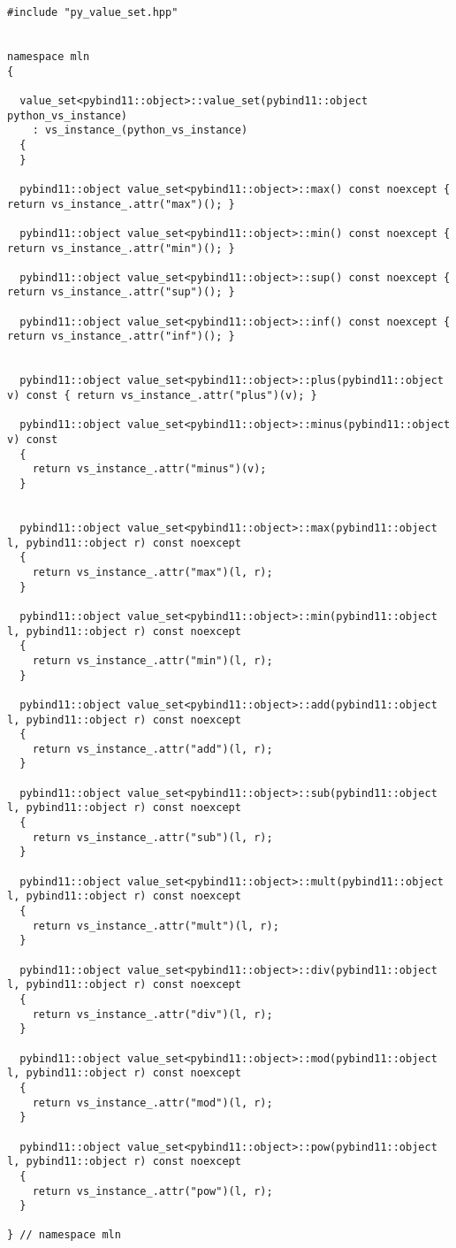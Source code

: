 \begin{verbatim}
#include "py_value_set.hpp"


namespace mln
{

  value_set<pybind11::object>::value_set(pybind11::object python_vs_instance)
    : vs_instance_(python_vs_instance)
  {
  }

  pybind11::object value_set<pybind11::object>::max() const noexcept { return vs_instance_.attr("max")(); }

  pybind11::object value_set<pybind11::object>::min() const noexcept { return vs_instance_.attr("min")(); }

  pybind11::object value_set<pybind11::object>::sup() const noexcept { return vs_instance_.attr("sup")(); }

  pybind11::object value_set<pybind11::object>::inf() const noexcept { return vs_instance_.attr("inf")(); }


  pybind11::object value_set<pybind11::object>::plus(pybind11::object v) const { return vs_instance_.attr("plus")(v); }

  pybind11::object value_set<pybind11::object>::minus(pybind11::object v) const
  {
    return vs_instance_.attr("minus")(v);
  }


  pybind11::object value_set<pybind11::object>::max(pybind11::object l, pybind11::object r) const noexcept
  {
    return vs_instance_.attr("max")(l, r);
  }

  pybind11::object value_set<pybind11::object>::min(pybind11::object l, pybind11::object r) const noexcept
  {
    return vs_instance_.attr("min")(l, r);
  }

  pybind11::object value_set<pybind11::object>::add(pybind11::object l, pybind11::object r) const noexcept
  {
    return vs_instance_.attr("add")(l, r);
  }

  pybind11::object value_set<pybind11::object>::sub(pybind11::object l, pybind11::object r) const noexcept
  {
    return vs_instance_.attr("sub")(l, r);
  }

  pybind11::object value_set<pybind11::object>::mult(pybind11::object l, pybind11::object r) const noexcept
  {
    return vs_instance_.attr("mult")(l, r);
  }

  pybind11::object value_set<pybind11::object>::div(pybind11::object l, pybind11::object r) const noexcept
  {
    return vs_instance_.attr("div")(l, r);
  }

  pybind11::object value_set<pybind11::object>::mod(pybind11::object l, pybind11::object r) const noexcept
  {
    return vs_instance_.attr("mod")(l, r);
  }

  pybind11::object value_set<pybind11::object>::pow(pybind11::object l, pybind11::object r) const noexcept
  {
    return vs_instance_.attr("pow")(l, r);
  }

} // namespace mln
\end{verbatim}


